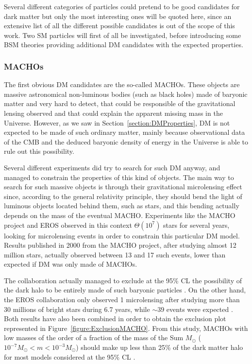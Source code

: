 \documentclass[a4paper, 10pt, openright]{report}
\begin{document}
Several different categories of particles could pretend to be good candidates for dark matter but only the most interesting ones will be quoted here, since an extensive list of all the different possible candidates is out of the scope of this work. Two \ac{SM} particles will first of all be investigated, before introducing some \ac{BSM} theories providing additional \ac{DM} candidates with the expected properties.

\subsubsection*{\acfp{MACHO}}
The first obvious \ac{DM} candidates are the so-called \acp{MACHO}. These objects are massive astronomical non-luminous bodies (such as black holes) made of baryonic matter and very hard to detect, that could be responsible of the gravitational lensing observed and that could explain the apparent missing mass in the Universe. However, as we saw in Section~\ref{section:DMProperties}, \ac{DM} is not expected to be made of such ordinary matter, mainly because observational data of the \ac{CMB} and the deduced baryonic density of energy in the Universe is able to rule out this possibility.

Several different experiments did try to search for such \ac{DM} anyway, and managed to constrain the properties of this kind of objects. The main way to search for such massive objects is through their gravitational microlensing effect since, according to the general relativity principle, they should bend the light of luminous objects located behind them, such as stars, and this bending actually depends on the mass of the eventual \ac{MACHO}. Experiments like the \ac{MACHO} project and EROS observed in this context $\Theta (10^7)$ stars for several years, looking for microlensing events in order to constrain this particular \ac{DM} model. Results published in 2000 from the MACHO project, after studying almost 12 million stars, actually observed between 13 and 17 such events, lower than expected if \ac{DM} was only made of \acp{MACHO}. 

The collaboration actually managed to exclude at the 95\% \ac{CL} the possibility of the dark halo to be entirely made of such baryonic particles \cite{MACHOProject}. On the other hand, the EROS collaboration only observed 1 microlensing after studying more than 30 millions of bright stars during 6.7 years, while $\sim39$ events were expected \cite{EROS}. Both results have also been combined in order to obtain the exclusion plot represented in Figure~\ref{figure:ExclusionMACHO}. From this study, \acp{MACHO} with low masses of the order of a fraction of the mass of the Sum $M_\odot$ ($10^{-7}M_\odot < m < 10^{-3}M_\odot$) should make up less than 25\% of the dark matter halo for most models considered at the 95\% \ac{CL} \cite{ExclusionMACHO}.
\end{document}
